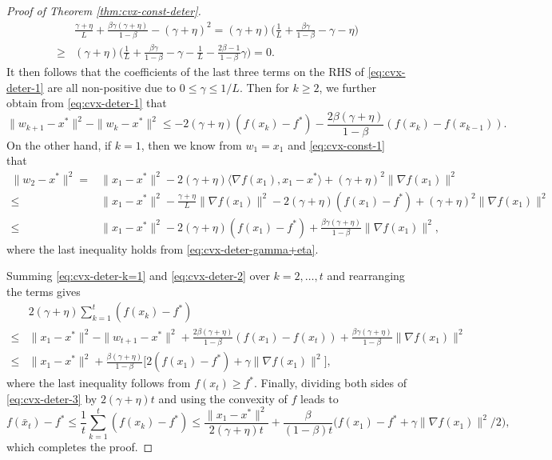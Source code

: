 \documentclass[10pt]{article}
\numberwithin{equation}{section}
\theoremstyle{definition}
\begin{document}
\begin{proof}[Proof of Theorem \ref{thm:cvx-const-deter}]
\begin{equation}\label{eq:cvx-deter-gamma+eta}
    \begin{aligned}
    &\frac{\gamma+\eta}{L}+\frac{\beta \gamma(\gamma+\eta)}{1-\beta}-(\gamma+\eta)^2 = (\gamma+\eta)\Big(\frac{1}{L}+\frac{\beta \gamma}{1-\beta}-\gamma-\eta\Big)\\
    \ge& (\gamma+\eta)\Big(\frac{1}{L}+\frac{\beta \gamma}{1-\beta}-\gamma-\frac{1}{L}-\frac{2 \beta-1}{1-\beta} \gamma\Big)=0.
\end{aligned}
\end{equation}
It then follows that the coefficients of the last three terms on the RHS of \eqref{eq:cvx-deter-1} are all non-positive due to $0\leq\gamma\leq 1/L$. Then for $k\ge 2$, we further obtain from \eqref{eq:cvx-deter-1} that
\begin{equation}\label{eq:cvx-deter-2}
    \|w_{k+1}-x^*\|^2 - \|w_k-x^*\|^2 \leq -2 (\gamma+\eta)(f(x_k)-f^*)-\frac{2 \beta(\gamma+\eta)}{1-\beta}(f(x_k)-f(x_{k-1})).
\end{equation}
On the other hand, if $k=1$, then we know from $w_1=x_1$ and \eqref{eq:cvx-const-1} that
\begin{equation}\label{eq:cvx-deter-k=1}
    \begin{aligned}
        \|w_2-x^*\|^2 = &\|x_1-x^*\|^2 - 2(\gamma+\eta)\langle \nabla f(x_1), x_1-x^*\rangle +(\gamma+\eta)^2\|\nabla f(x_1)\|^2\\
        \leq & \|x_1-x^*\|^2 - \frac{\gamma+\eta}{L}\|\nabla f(x_1)\|^2 - 2(\gamma+\eta)(f(x_1)-f^*) +(\gamma+\eta)^2\|\nabla f(x_1)\|^2\\
        \leq & \|x_1-x^*\|^2 - 2(\gamma+\eta)(f(x_1)-f^*) +\frac{\beta \gamma(\gamma+\eta)}{1-\beta}\|\nabla f(x_1)\|^2,
    \end{aligned}
\end{equation}
where the last inequality holds from \eqref{eq:cvx-deter-gamma+eta}.

Summing \eqref{eq:cvx-deter-k=1} and \eqref{eq:cvx-deter-2} over $k=2, \dots, t$ and rearranging the terms gives
\begin{equation}\label{eq:cvx-deter-3}
\begin{aligned}
    &2(\gamma+\eta) \sum_{k=1}^t (f(x_k)-f^*)\\
    \leq & \|x_1-x^*\|^2-\|w_{t+1}-x^*\|^2+\frac{2 \beta(\gamma+\eta)}{1-\beta} (f(x_1)-f(x_t))+\frac{\beta \gamma(\gamma+\eta)}{1-\beta}\|\nabla f(x_1)\|^2\\
    \leq & \|x_1-x^*\|^2+\frac{\beta(\gamma+\eta)}{1-\beta}\big[2(f(x_1)-f^*)+\gamma\|\nabla f(x_1)\|^2\big],
\end{aligned}
\end{equation}
where the last inequality follows from $f(x_t)\ge f^*$.
Finally, dividing both sides of \eqref{eq:cvx-deter-3} by $2(\gamma+\eta)t$ and using the convexity of $f$ leads to
\[
f(\bar{x}_t)-f^* \leq \frac{1}{t}\sum_{k=1}^t (f(x_k)-f^*)\leq\frac{\|x_1-x^*\|^2}{2(\gamma+\eta) t}+\frac{\beta}{(1-\beta)t}\big(f(x_1)-f^* +\gamma\|\nabla f(x_1)\|^2/2\big),
\]
which completes the proof.
\end{proof}
\end{document}
